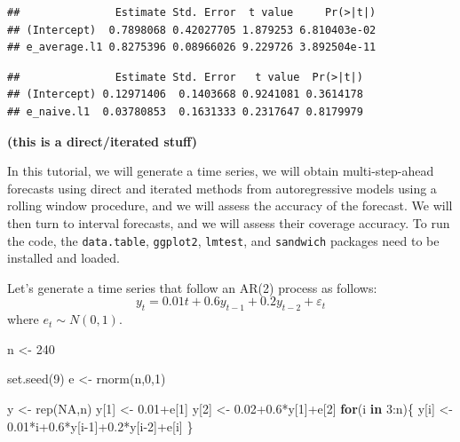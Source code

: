 \documentclass[
  12pt,
  oneside]{book}
\newenvironment{Shaded}{\begin{snugshade}}{\end{snugshade}}
\newcommand{\AttributeTok}[1]{\textcolor[rgb]{0.77,0.63,0.00}{#1}}
\newcommand{\ConstantTok}[1]{\textcolor[rgb]{0.00,0.00,0.00}{#1}}
\newcommand{\ControlFlowTok}[1]{\textcolor[rgb]{0.13,0.29,0.53}{\textbf{#1}}}
\newcommand{\DecValTok}[1]{\textcolor[rgb]{0.00,0.00,0.81}{#1}}
\newcommand{\FloatTok}[1]{\textcolor[rgb]{0.00,0.00,0.81}{#1}}
\newcommand{\FunctionTok}[1]{\textcolor[rgb]{0.00,0.00,0.00}{#1}}
\newcommand{\NormalTok}[1]{#1}
\newcommand{\OtherTok}[1]{\textcolor[rgb]{0.56,0.35,0.01}{#1}}
\newcommand{\SpecialCharTok}[1]{\textcolor[rgb]{0.00,0.00,0.00}{#1}}
\begin{document}
\begin{verbatim}
##               Estimate Std. Error  t value     Pr(>|t|)
## (Intercept)  0.7898068 0.42027705 1.879253 6.810403e-02
## e_average.l1 0.8275396 0.08966026 9.229726 3.892504e-11
\end{verbatim}

\begin{Shaded}
\end{Shaded}

\begin{verbatim}
##               Estimate Std. Error   t value  Pr(>|t|)
## (Intercept) 0.12971406  0.1403668 0.9241081 0.3614178
## e_naive.l1  0.03780853  0.1631333 0.2317647 0.8179979
\end{verbatim}

\textbf{(this is a direct/iterated stuff)}

In this tutorial, we will generate a time series, we will obtain multi-step-ahead forecasts using direct and iterated methods from autoregressive models using a rolling window procedure, and we will assess the accuracy of the forecast. We will then turn to interval forecasts, and we will assess their coverage accuracy. To run the code, the \texttt{data.table}, \texttt{ggplot2}, \texttt{lmtest}, and \texttt{sandwich} packages need to be installed and loaded.

Let's generate a time series that follow an AR(2) process as follows:
\[y_t = 0.01t+0.6y_{t-1}+0.2y_{t-2}+\varepsilon_t\]
where \(e_{t} \sim N(0,1)\).

\begin{Shaded}
\begin{Highlighting}[]
\NormalTok{n }\OtherTok{\textless{}{-}} \DecValTok{240}

\FunctionTok{set.seed}\NormalTok{(}\DecValTok{9}\NormalTok{)}
\NormalTok{e }\OtherTok{\textless{}{-}} \FunctionTok{rnorm}\NormalTok{(n,}\DecValTok{0}\NormalTok{,}\DecValTok{1}\NormalTok{)}

\NormalTok{y }\OtherTok{\textless{}{-}} \FunctionTok{rep}\NormalTok{(}\ConstantTok{NA}\NormalTok{,n)}
\NormalTok{y[}\DecValTok{1}\NormalTok{] }\OtherTok{\textless{}{-}} \FloatTok{0.01}\SpecialCharTok{+}\NormalTok{e[}\DecValTok{1}\NormalTok{]}
\NormalTok{y[}\DecValTok{2}\NormalTok{] }\OtherTok{\textless{}{-}} \FloatTok{0.02+0.6}\SpecialCharTok{*}\NormalTok{y[}\DecValTok{1}\NormalTok{]}\SpecialCharTok{+}\NormalTok{e[}\DecValTok{2}\NormalTok{]}
\ControlFlowTok{for}\NormalTok{(i }\ControlFlowTok{in} \DecValTok{3}\SpecialCharTok{:}\NormalTok{n)\{}
\NormalTok{  y[i] }\OtherTok{\textless{}{-}} \FloatTok{0.01}\SpecialCharTok{*}\NormalTok{i}\FloatTok{+0.6}\SpecialCharTok{*}\NormalTok{y[i}\DecValTok{{-}1}\NormalTok{]}\SpecialCharTok{+}\FloatTok{0.2}\SpecialCharTok{*}\NormalTok{y[i}\DecValTok{{-}2}\NormalTok{]}\SpecialCharTok{+}\NormalTok{e[i]}
\NormalTok{\}}
\end{Highlighting}
\end{Shaded}
\end{document}
